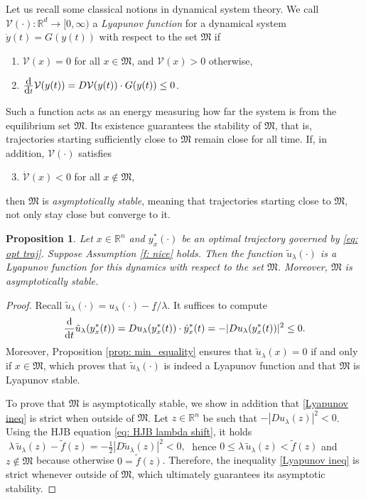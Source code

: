 \documentclass[12pt]{amsart}
\newcommand{\D}[1]{\mbox{\rm #1}}
\newcommand{\dd}{\D{d}}
\numberwithin{equation}{section}
\theoremstyle{plain}
\newtheorem{proposition}[theorem]{Proposition}
\begin{document}
Let us recall some classical notions in dynamical system theory. We call $\mathcal{V}(\cdot):\mathbb{R}^{d}\to [0,\infty)$ a \textit{Lyapunov function} for a dynamical system $\dot{y}(t) = G(y(t))$ with respect to the set $\mathfrak{M}$ if 
\begin{enumerate}[label = (\roman*)]
    \item $\mathcal{V}(x) = 0$ for all $x\in \mathfrak{M}$, and $\mathcal{V}(x)>0$ otherwise,
    \item $\frac{\dd}{\dd t} \mathcal{V}(y(t)) = D \mathcal{V}(y(t))\cdot G(y(t)) \leq 0$.
\end{enumerate}
Such a function acts as an energy measuring how far the system is from the equilibrium set $\mathfrak{M}$. Its existence guarantees the stability of $\mathfrak{M}$, that is, trajectories starting sufficiently close to $\mathfrak{M}$ remain close for all time. If, in addition, $\mathcal{V}(\cdot)$ satisfies
\begin{enumerate}[label = (\roman*)]
\setcounter{enumi}{2}
    \item $\dot{\mathcal{V}}(x) < 0$ for all $x\notin \mathfrak{M}$,
\end{enumerate}
then $\mathfrak{M}$ is \textit{asymptotically stable}, meaning that trajectories starting close to $\mathfrak{M}$, not only stay close but converge to it. 


\begin{proposition}
Let $x\in\mathbb{R}^{n}$ and $y^{*}_{x}(\cdot)$ be an optimal trajectory governed by \eqref{eq: opt traj}. 
Suppose Assumption \ref{f: nice}  holds. 
Then the function $\tilde{u}_{\lambda}(\cdot)$ is a Lyapunov function for this dynamics with respect to the set $\mathfrak{M}$. Moreover, $\mathfrak{M}$ is asymptotically stable. 
\end{proposition}

\begin{proof}
Recall $\tilde{u}_{\lambda}(\cdot) = u_{\lambda}(\cdot) - \underline{f}/\lambda$. 
It suffices to compute
\begin{equation}\label{Lyapunov ineq}
    \frac{\dd}{\dd t} \tilde{u}_{\lambda}(y^{*}_{x}(t)) = Du_{\lambda}(y^{*}_{x}(t))\cdot \dot{y}^{*}_{x}(t) = - |Du_{\lambda}(y^{*}_{x}(t))|^{2} \leq 0.
\end{equation}
Moreover, Proposition \ref{prop: min_equality} ensures that $\tilde{u}_{\lambda}(x) =0$ if and only if $x\in \mathfrak{M}$, which proves that $\tilde{u}_{\lambda}(\cdot)$ is indeed a Lyapunov function and that $\mathfrak{M}$ is Lyapunov stable. 

To prove that $\mathfrak{M}$ is asymptotically stable, we show in addition that \eqref{Lyapunov ineq} is strict when outside of $\mathfrak{M}$. Let $z\in\mathbb{R}^{n}$ be such that $-|Du_{\lambda}(z)|^{2} <0$. Using the HJB equation \eqref{eq: HJB lambda shift}, it holds $\; \lambda\, \tilde{u}_{\lambda}(z) - \tilde{f}(z) = - \frac{1}{2}|D\tilde{u}_{\lambda}(z)|^{2}  <0, \;$ hence $0\leq \lambda\, \tilde{u}_{\lambda}(z) < \tilde{f}(z) $ and $z\notin \mathfrak{M}$ because otherwise $0=\tilde{f}(z)$. Therefore, the inequality \eqref{Lyapunov ineq} is strict whenever outside of $\mathfrak{M}$, which ultimately guarantees its asymptotic stability.
\end{proof}
\end{document}
